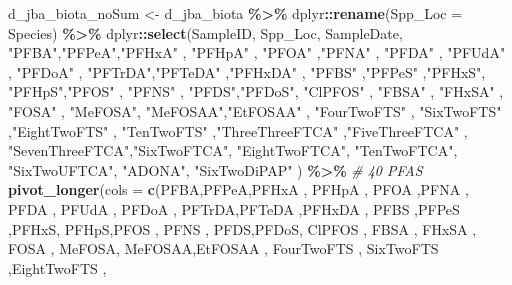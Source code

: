 \documentclass[
]{article}
\newenvironment{Shaded}{\begin{snugshade}}{\end{snugshade}}
\newcommand{\AttributeTok}[1]{\textcolor[rgb]{0.13,0.29,0.53}{#1}}
\newcommand{\CommentTok}[1]{\textcolor[rgb]{0.56,0.35,0.01}{\textit{#1}}}
\newcommand{\FunctionTok}[1]{\textcolor[rgb]{0.13,0.29,0.53}{\textbf{#1}}}
\newcommand{\NormalTok}[1]{#1}
\newcommand{\OtherTok}[1]{\textcolor[rgb]{0.56,0.35,0.01}{#1}}
\newcommand{\SpecialCharTok}[1]{\textcolor[rgb]{0.81,0.36,0.00}{\textbf{#1}}}
\newcommand{\StringTok}[1]{\textcolor[rgb]{0.31,0.60,0.02}{#1}}
\begin{document}
\begin{Shaded}
\begin{Highlighting}[]
\NormalTok{d\_jba\_biota\_noSum }\OtherTok{\textless{}{-}}\NormalTok{ d\_jba\_biota }\SpecialCharTok{\%\textgreater{}\%}
\NormalTok{  dplyr}\SpecialCharTok{::}\FunctionTok{rename}\NormalTok{(}\AttributeTok{Spp\_Loc =}\NormalTok{ Species) }\SpecialCharTok{\%\textgreater{}\%}
\NormalTok{  dplyr}\SpecialCharTok{::}\FunctionTok{select}\NormalTok{(SampleID, Spp\_Loc, SampleDate,}
                \StringTok{"PFBA"}\NormalTok{,}\StringTok{"PFPeA"}\NormalTok{,}\StringTok{"PFHxA"}\NormalTok{ ,}
                \StringTok{"PFHpA"}\NormalTok{ , }\StringTok{"PFOA"}\NormalTok{ ,}\StringTok{"PFNA"}\NormalTok{ ,}
                \StringTok{"PFDA"}\NormalTok{ , }\StringTok{"PFUdA"}\NormalTok{  , }\StringTok{"PFDoA"}\NormalTok{  ,}
                \StringTok{"PFTrDA"}\NormalTok{,}\StringTok{"PFTeDA"}\NormalTok{ ,}\StringTok{"PFHxDA"}\NormalTok{ ,}
                \StringTok{"PFBS"}\NormalTok{ ,}\StringTok{"PFPeS"}\NormalTok{ ,}\StringTok{"PFHxS"}\NormalTok{,}
                \StringTok{"PFHpS"}\NormalTok{,}\StringTok{"PFOS"}\NormalTok{ , }\StringTok{"PFNS"}\NormalTok{ ,}
                \StringTok{"PFDS"}\NormalTok{,}\StringTok{"PFDoS"}\NormalTok{, }\StringTok{"ClPFOS"}\NormalTok{  ,}
                \StringTok{"FBSA"}\NormalTok{  , }\StringTok{"FHxSA"}\NormalTok{ , }\StringTok{"FOSA"}\NormalTok{ ,}
                \StringTok{"MeFOSA"}\NormalTok{, }\StringTok{"MeFOSAA"}\NormalTok{,}\StringTok{"EtFOSAA"}\NormalTok{ ,}
                \StringTok{"FourTwoFTS"}\NormalTok{ , }\StringTok{"SixTwoFTS"}\NormalTok{ ,}\StringTok{"EightTwoFTS"}\NormalTok{ ,}
                \StringTok{"TenTwoFTS"}\NormalTok{  ,}\StringTok{"ThreeThreeFTCA"}\NormalTok{ ,}\StringTok{"FiveThreeFTCA"}\NormalTok{ ,}
                \StringTok{"SevenThreeFTCA"}\NormalTok{,}\StringTok{"SixTwoFTCA"}\NormalTok{, }\StringTok{"EightTwoFTCA"}\NormalTok{, }
                \StringTok{"TenTwoFTCA"}\NormalTok{, }\StringTok{"SixTwoUFTCA"}\NormalTok{, }\StringTok{"ADONA"}\NormalTok{, }
                \StringTok{"SixTwoDiPAP"}\NormalTok{ ) }\SpecialCharTok{\%\textgreater{}\%} \CommentTok{\# 40 PFAS}
  \FunctionTok{pivot\_longer}\NormalTok{(}\AttributeTok{cols =} \FunctionTok{c}\NormalTok{(PFBA,PFPeA,PFHxA ,}
\NormalTok{                PFHpA , PFOA ,PFNA ,}
\NormalTok{                PFDA , PFUdA  , PFDoA  ,}
\NormalTok{                PFTrDA,PFTeDA ,PFHxDA ,}
\NormalTok{                PFBS ,PFPeS ,PFHxS,}
\NormalTok{                PFHpS,PFOS , PFNS ,}
\NormalTok{                PFDS,PFDoS, ClPFOS  ,}
\NormalTok{                FBSA  , FHxSA , FOSA ,}
\NormalTok{                MeFOSA, MeFOSAA,EtFOSAA ,}
\NormalTok{                FourTwoFTS , SixTwoFTS ,EightTwoFTS ,}

\end{Highlighting}
\end{Shaded}
\end{document}
